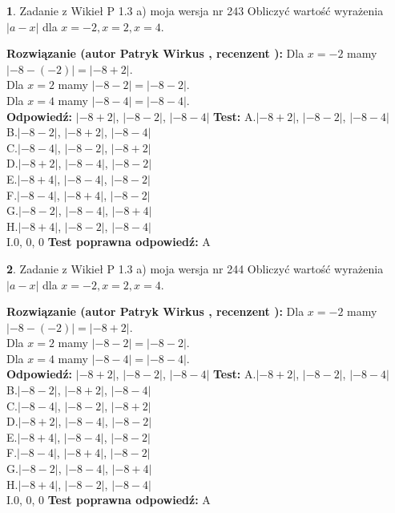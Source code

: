 \documentclass[12pt, a4paper]{article}
\theoremstyle{definition} %
\newtheorem{zad}{}
\newcommand{\zadStart}[1]{\begin{zad}#1\newline}
\newcommand{\zadStop}{\end{zad}}
\newcommand{\rozwStart}[2]{\noindent \textbf{Rozwiązanie (autor #1 , recenzent #2): }\newline}
\newcommand{\rozwStop}{\newline}
\newcommand{\odpStart}{\noindent \textbf{Odpowiedź:}\newline}
\newcommand{\odpStop}{\newline}
\newcommand{\testStart}{\noindent \textbf{Test:}\newline}
\newcommand{\testStop}{\newline}
\newcommand{\kluczStart}{\noindent \textbf{Test poprawna odpowiedź:}\newline}
\newcommand{\kluczStop}{\newline}
\begin{document}
\zadStart{Zadanie z Wikieł P 1.3 a) moja wersja nr 243}
Obliczyć wartość wyrażenia $|a - x|$ dla $x=-2,x=2,x=4$.
\zadStop
\rozwStart{Patryk Wirkus}{}
Dla $x = -2$ mamy $|-8 - (-2)| = |-8 + 2|$.\\
Dla $x = 2$ mamy $|-8 - 2| = |-8 - 2|$.\\
Dla $x = 4$ mamy $|-8 - 4| = |-8 - 4|$.\\
\rozwStop
\odpStart
$|-8 + 2|$, $|-8 - 2|$, $|-8 - 4|$
\odpStop
\testStart
A.$|-8 + 2|$, $|-8 - 2|$, $|-8 - 4|$\\
B.$|-8 - 2|$, $|-8 + 2|$, $|-8 - 4|$\\
C.$|-8 - 4|$, $|-8 - 2|$, $|-8 + 2|$\\
D.$|-8 + 2|$, $|-8 - 4|$, $|-8 - 2|$\\
E.$|-8 + 4|$, $|-8 - 4|$, $|-8 - 2|$\\
F.$|-8 - 4|$, $|-8 + 4|$, $|-8 - 2|$\\
G.$|-8 - 2|$, $|-8 - 4|$, $|-8 + 4|$\\
H.$|-8 + 4|$, $|-8 - 2|$, $|-8 - 4|$\\
I.$0$, $0$, $0$
\testStop
\kluczStart
A
\kluczStop



\zadStart{Zadanie z Wikieł P 1.3 a) moja wersja nr 244}
Obliczyć wartość wyrażenia $|a - x|$ dla $x=-2,x=2,x=4$.
\zadStop
\rozwStart{Patryk Wirkus}{}
Dla $x = -2$ mamy $|-8 - (-2)| = |-8 + 2|$.\\
Dla $x = 2$ mamy $|-8 - 2| = |-8 - 2|$.\\
Dla $x = 4$ mamy $|-8 - 4| = |-8 - 4|$.\\
\rozwStop
\odpStart
$|-8 + 2|$, $|-8 - 2|$, $|-8 - 4|$
\odpStop
\testStart
A.$|-8 + 2|$, $|-8 - 2|$, $|-8 - 4|$\\
B.$|-8 - 2|$, $|-8 + 2|$, $|-8 - 4|$\\
C.$|-8 - 4|$, $|-8 - 2|$, $|-8 + 2|$\\
D.$|-8 + 2|$, $|-8 - 4|$, $|-8 - 2|$\\
E.$|-8 + 4|$, $|-8 - 4|$, $|-8 - 2|$\\
F.$|-8 - 4|$, $|-8 + 4|$, $|-8 - 2|$\\
G.$|-8 - 2|$, $|-8 - 4|$, $|-8 + 4|$\\
H.$|-8 + 4|$, $|-8 - 2|$, $|-8 - 4|$\\
I.$0$, $0$, $0$
\testStop
\kluczStart
A
\kluczStop
\end{document}
